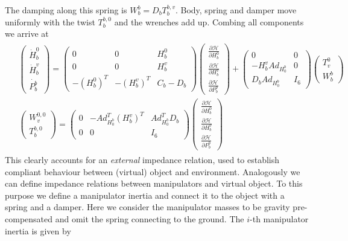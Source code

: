 \documentclass[a4paper,twoside, openright,12pt]{report}
\begin{document}
{The damping along this spring is $W_b^b = D_b T_b^{b,v} $. Body, spring and damper move uniformly with the twist $T_b^{b,0}$ and the wrenches add up. Combing all components we arrive at
\begin{eqnarray} \label{EQ:externalimpedance}
\begin{aligned}
&\begin{pmatrix}\dot{H}_b^0 \\ \dot{H}_b^v \\  \dot{P_b^b}\end{pmatrix} =
\begin{pmatrix} 0 & 0 & H_b^0  \\ 0 & 0 & H_b^v \\
- (H_b^0)^T & -(H_b^v)^T & C_b-D_b\end{pmatrix}
\begin{pmatrix}\frac{\partial \mathcal{H}}{\partial H_b^0}\\ \frac{\partial \mathcal{H}}{\partial H_b^v} \\ \frac{\partial \mathcal{H}}{\partial P_b^b}\end{pmatrix}+
\begin{pmatrix} 0 & 0\\ -H_b^v Ad_{H_0^b} & 0 \\ D_b Ad_{H_0^b} & I_6 \end{pmatrix}\begin{pmatrix} T_v^0 \\ W_{b}^b\end{pmatrix} \\
&\begin{pmatrix}W_v^{0,0} \\ T_b^{b,0}\end{pmatrix} = \begin{pmatrix}0 & -Ad_{H_0^b}^T (H_b^v)^T & Ad_{H_0^b}^T D_b\\ 0 & 0 & I_6 \end{pmatrix}
\begin{pmatrix}\frac{\partial \mathcal{H}}{\partial H_b^0}\\ \frac{\partial \mathcal{H}}{\partial H_b^v} \\ \frac{\partial \mathcal{H}}{\partial P_b^b}\end{pmatrix}
\end{aligned}
\end{eqnarray}
This clearly accounts for an \emph{external} impedance relation, used to establish compliant behaviour between (virtual) object and environment. Analogously we can define impedance relations between manipulators and virtual object. To this purpose we define a manipulator inertia and connect it to the object with a spring and a damper. Here we consider the manipulator masses to be gravity pre-compensated and omit the spring connecting to the ground. The $i$-th manipulator inertia is given by
}
\end{document}
